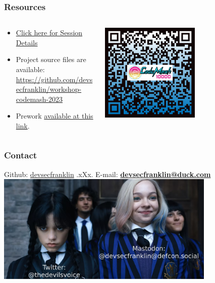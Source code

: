 \documentclass[aspectratio=169]{beamer}
\begin{document}
\begin{frame}
	\frametitle{Resources}
	\begin{columns}
		\begin{column}{0.65\textwidth}
			\begin{itemize}
				\item \href{https://www.codemash.org/session-details/?id=375030}{Click here for Session Details}
				\item Project source files are available: \url{https://github.com/devsecfranklin/workshop-codemash-2023}
				\item Prework \href{https://prereqs.codemash.org/}{available at this link}.
			\end{itemize}
		\end{column}
		\begin{column}{0.35\textwidth}
			\begin{center}
				\includegraphics[width=0.585\textwidth]{../images/qr-code.png}
			\end{center}
		\end{column}
	\end{columns}
\end{frame}

\begin{frame}
	\frametitle{Contact}
	\begin{center}
		Github: \href{https://github.com/devsecfranklin}{devsecfranklin} .xXx. 
		E-mail: \textbf{\href{mailto:devsecfranklin@duck.com}{devsecfranklin@duck.com}}
		\vspace{2mm}
		\includegraphics[width=0.785\textwidth]{../images/contact.png}
	\end{center}
\end{frame}
\end{document}
